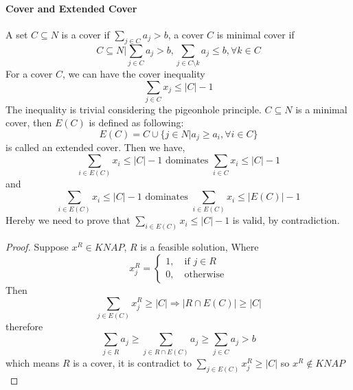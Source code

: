             \paragraph{Cover and Extended Cover}
                A set $C\subseteq N$ is a cover if $\sum_{j\in C} a_j > b$, a cover $C$ is minimal cover if
                \begin{equation*}
                    C\subseteq N | \sum_{j\in C}a_j > b, \sum_{j\in C\setminus k} a_j \le b, \forall k \in C 
                \end{equation*}
                For a cover $C$, we can have the cover inequality
                \begin{equation*}
                    \sum_{j\in C}x_j \le |C|-1
                \end{equation*}
                The inequality is trivial considering the pigeonhole principle. $C\subseteq N$ is a minimal cover, then $E(C)$ is defined as following:
                \begin{equation*}
                    E(C) = C\cup \{j \in N | a_j \ge a_i, \forall i \in C\}
                \end{equation*}
                is called an extended cover. Then we have,
                \begin{equation*}
                    \sum_{i\in E(C)} x_i \le |C| - 1 \text{ dominates } \sum_{i\in C} x_i \le |C| - 1
                \end{equation*}
                and
                \begin{equation*}
                    \sum_{i\in E(C)} x_i \le |C| - 1 \text{ dominates } \sum_{i\in E(C)} x_i \le |E(C)| - 1
                \end{equation*}
                Hereby we need to prove that $\sum_{i\in E(C)} x_i \le |C| - 1$ is valid, by contradiction.\\
                \begin{proof}
                    Suppose $x^R \in KNAP$, $R$ is a feasible solution, Where
                    \begin{equation*}
                        x^R_j = \begin{cases}1, \quad \text{if $j\in R$} \\ 0, \quad \text{otherwise}\end{cases} 
                    \end{equation*}
                    Then
                    \begin{equation*}
                        \sum_{j\in E(C)}x^R_j \ge |C| \Rightarrow |R \cap E(C)| \ge |C|  
                    \end{equation*}
                    therefore
                    \begin{equation*}
                        \sum_{j\in R}a_j \ge \sum_{j\in R \cap E(C)} a_j \ge \sum_{j\in C} a_j > b 
                    \end{equation*}
                    which means $R$ is a cover, it is contradict to $\sum_{j\in E(C)}x^R_j \ge |C|$ so $x^R \notin KNAP$
                \end{proof}

